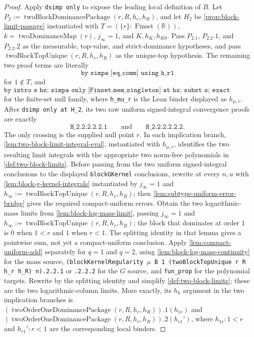 \documentclass[9pt]{extarticle}
\theoremstyle{definition}
\theoremstyle{remark}
\newcommand{\R}{\mathbb R}
\begin{document}
\begin{proof}
Apply \texttt{dsimp only} to expose the leading local definition of $B$.
Let
$P_2:=\operatorname{twoBlockDominancePackage}(r,R,h_r,h_R)$, and let
$H_2$ be \cref{prop:block-limit-passage} instantiated with
$T=(\{r\}:\operatorname{Finset}(\R))$,
$k=\operatorname{twoDominanceMap}(r)$, $j_\infty=1$, and
$K,h_K,h_{K0}$.  Pass $P_2.1$, $P_2.2.1$, and $P_2.2.2$ as the measurable,
top-value, and strict-dominance hypotheses, and pass
$\operatorname{twoBlockTopUnique}(r,R,h_r,h_R)$ as the unique-top
hypothesis.  The remaining two proof terms are literally
\[
 \texttt{by simpa [eq\_comm] using h\_r1}
\]
for $1\notin T$, and
\[
 \texttt{by intro s hs; simpa only [Finset.mem\_singleton] at hs;
 subst s; exact h\_mu\_r}
\]
for the finite-set null family, where \texttt{h\_mu\_r} is the Lean binder
displayed as $h_{\mu,r}$.  After \texttt{dsimp only at H\_2}, its two raw
uniform signed-integral convergence proofs are exactly
\[
 \texttt{H\_2.2.2.2.2.1}
 \qquad\text{and}\qquad
 \texttt{H\_2.2.2.2.2.2}.
\]
The only crossing is the supplied null point
$r$.  In each implication branch,
\cref{lem:two-block-limit-integral-eval}, instantiated with $h_{\mu,r}$,
identifies the two resulting limit integrals with the appropriate two
norm-free polynomials in \cref{def:two-block-limits}.  Before passing from
the two uniform signed-integral conclusions to the displayed
\texttt{blockGKernel} conclusions, rewrite at every $n,u$ with
\cref{lem:block-g-kernel-integrals} instantiated by $j_\infty=1$ and
$h_\infty:=\operatorname{twoBlockTopUnique}(r,R,h_r,h_R)$; then
\cref{lem:subtype-uniform-error-bridge} gives the required compact-uniform
errors.  Obtain the two logarithmic-mass limits from
\cref{lem:block-log-mass-limit}, passing
$j_\infty=1$ and
$h_\infty:=\operatorname{twoBlockTopUnique}(r,R,h_r,h_R)$; the block that
dominates at order $1$ is $0$ when $1<r$ and $1$ when $r<1$.  The splitting
identity in that lemma gives a pointwise sum, not yet a
compact-uniform conclusion.  Apply \cref{lem:compact-uniform-add} separately
for $q=1$ and $q=2$, using
\cref{lem:block-log-mass-continuity} for the mass source,
\texttt{(blockKernelRegularity $\mu$ B 1
 (twoBlockTopUnique r R h\_r h\_R) n).2.2.1} or
\texttt{.2.2.2} for the $G$ source, and \texttt{fun\_prop} for the
polynomial targets.  Rewrite by the splitting identity and simplify
\cref{def:two-block-limits}; these are the two logarithmic-column limits.
More
exactly, its $h_k$ argument in the two implication branches is
$(\operatorname{twoOrderOneDominancePackage}(r,R,h_r,h_R)).1(h_{1r})$ and
$(\operatorname{twoOrderOneDominancePackage}(r,R,h_r,h_R)).2(h_{r1}')$,
where $h_{1r}:1<r$ and $h_{r1}':r<1$ are the corresponding local binders.
\end{proof}
\end{document}
